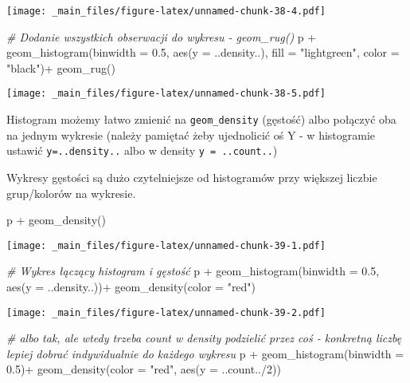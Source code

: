 \documentclass[
]{book}
\newenvironment{Shaded}{\begin{snugshade}}{\end{snugshade}}
\newcommand{\AttributeTok}[1]{\textcolor[rgb]{0.77,0.63,0.00}{#1}}
\newcommand{\CommentTok}[1]{\textcolor[rgb]{0.56,0.35,0.01}{\textit{#1}}}
\newcommand{\DecValTok}[1]{\textcolor[rgb]{0.00,0.00,0.81}{#1}}
\newcommand{\FloatTok}[1]{\textcolor[rgb]{0.00,0.00,0.81}{#1}}
\newcommand{\FunctionTok}[1]{\textcolor[rgb]{0.00,0.00,0.00}{#1}}
\newcommand{\NormalTok}[1]{#1}
\newcommand{\SpecialCharTok}[1]{\textcolor[rgb]{0.00,0.00,0.00}{#1}}
\newcommand{\StringTok}[1]{\textcolor[rgb]{0.31,0.60,0.02}{#1}}
\begin{document}
\texttt{[image: \_main\_files/figure-latex/unnamed-chunk-38-4.pdf]}

\begin{Shaded}
\begin{Highlighting}[]
\CommentTok{\# Dodanie wszystkich obserwacji do wykresu {-} geom\_rug()}
\NormalTok{p }\SpecialCharTok{+} \FunctionTok{geom\_histogram}\NormalTok{(}\AttributeTok{binwidth =} \FloatTok{0.5}\NormalTok{, }\FunctionTok{aes}\NormalTok{(}\AttributeTok{y =}\NormalTok{ ..density..), }
                   \AttributeTok{fill =} \StringTok{"lightgreen"}\NormalTok{, }\AttributeTok{color =} \StringTok{"black"}\NormalTok{)}\SpecialCharTok{+}
  \FunctionTok{geom\_rug}\NormalTok{()}
\end{Highlighting}
\end{Shaded}

\texttt{[image: \_main\_files/figure-latex/unnamed-chunk-38-5.pdf]}

Histogram możemy łatwo zmienić na \texttt{geom\_density} (gęstość) albo połączyć oba na jednym wykresie (należy pamiętać żeby ujednolicić oś Y - w histogramie ustawić \texttt{y=..density..} albo w density \texttt{y\ =\ ..count..})

Wykresy gęstości są dużo czytelniejsze od histogramów przy większej liczbie grup/kolorów na wykresie.

\begin{Shaded}
\begin{Highlighting}[]
\NormalTok{p }\SpecialCharTok{+} \FunctionTok{geom\_density}\NormalTok{()}
\end{Highlighting}
\end{Shaded}

\texttt{[image: \_main\_files/figure-latex/unnamed-chunk-39-1.pdf]}

\begin{Shaded}
\begin{Highlighting}[]
\CommentTok{\# Wykres łączący histogram i gęstość}
\NormalTok{p }\SpecialCharTok{+} \FunctionTok{geom\_histogram}\NormalTok{(}\AttributeTok{binwidth =} \FloatTok{0.5}\NormalTok{, }\FunctionTok{aes}\NormalTok{(}\AttributeTok{y =}\NormalTok{ ..density..))}\SpecialCharTok{+}
  \FunctionTok{geom\_density}\NormalTok{(}\AttributeTok{color =} \StringTok{"red"}\NormalTok{)}
\end{Highlighting}
\end{Shaded}

\texttt{[image: \_main\_files/figure-latex/unnamed-chunk-39-2.pdf]}

\begin{Shaded}
\begin{Highlighting}[]
\CommentTok{\# albo tak, ale wtedy trzeba count w density podzielić przez coś {-} konkretną liczbę lepiej dobrać indywidualnie do każdego wykresu}
\NormalTok{p }\SpecialCharTok{+} \FunctionTok{geom\_histogram}\NormalTok{(}\AttributeTok{binwidth =} \FloatTok{0.5}\NormalTok{)}\SpecialCharTok{+}
  \FunctionTok{geom\_density}\NormalTok{(}\AttributeTok{color =} \StringTok{"red"}\NormalTok{, }\FunctionTok{aes}\NormalTok{(}\AttributeTok{y =}\NormalTok{ ..count..}\SpecialCharTok{/}\DecValTok{2}\NormalTok{))}
\end{Highlighting}
\end{Shaded}
\end{document}
